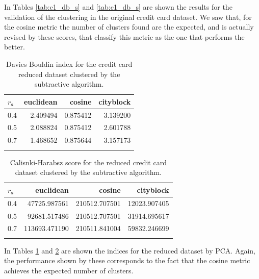    In Tables \ref{tab:c1_db_s} and \ref{tab:c1_db_s} are shown the results for the validation of the clustering in the original credit card dataset. We saw that, for the cosine metric the number of clusters found are the expected, and is actually revised by these scores, that classify this metric as the one that performs the better. \\
    
    \begin{table}[ht!]
        \centering
        \begin{tabular}{lrrr}
        \toprule
        $r_a$ &  euclidean &    cosine &  cityblock \\
        \midrule
        0.4 &   2.409494 &  0.875412 &   3.139200 \\
        0.5 &   2.088824 &  0.875412 &   2.601788 \\
        0.7 &   1.468652 &  0.875644 &   3.157173 \\
        \bottomrule \\
        \end{tabular}
        \caption{Davies Bouldin index for the credit card reduced dataset clustered by the subtractive algorithm.}
        \label{tab:c2_db_s}
    \end{table}
    
    \begin{table}[ht!]
        \centering
        \begin{tabular}{lrrr}
        \toprule
        $r_a$ &      euclidean &         cosine &     cityblock \\
        \midrule
        0.4 &   47725.987561 &  210512.707501 &  12023.907405 \\
        0.5 &   92681.517486 &  210512.707501 &  31914.695617 \\
        0.7 &  113693.471190 &  210511.841004 &  59832.246699 \\
        \bottomrule \\
        \end{tabular}
        \caption{Calisnki-Harabsz score for the reduced credit card dataset clustered by the subtractive algorithm.}
        \label{tab:c2_ch_s}
    \end{table}
    
    In Tables \ref{tab:c2_db_s} and \ref{tab:c2_ch_s} are shown the indices for the reduced dataset by PCA. Again, the performance shown by these corresponds to the fact that the cosine metric achieves the expected number of clusters.
    
